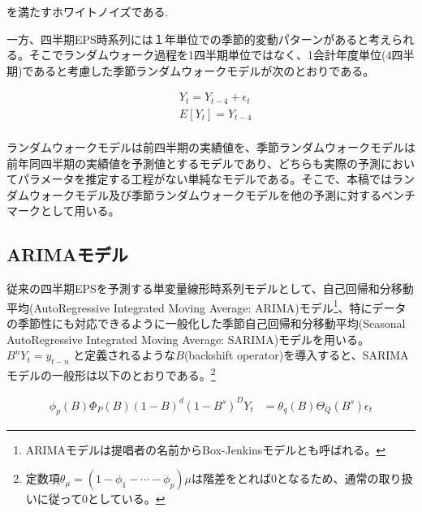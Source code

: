 \documentclass[a4paper, 12pt]{jsreport}
\begin{document}
を満たすホワイトノイズである.

一方、四半期EPS時系列には１年単位での季節的変動パターンがあると考えられる。そこでランダムウォーク過程を1四半期単位ではなく、1会計年度単位(4四半期)であると考慮した季節ランダムウォークモデルが次のとおりである。

\begin{equation}
  \begin{split}
    & Y_t = Y_{t-4} + \epsilon_t \\
    & E[Y_t] = Y_{t-4} \\
  \end{split}
\end{equation} 

ランダムウォークモデルは前四半期の実績値を、季節ランダムウォークモデルは前年同四半期の実績値を予測値とするモデルであり、どちらも実際の予測においてパラメータを推定する工程がない単純なモデルである。そこで、本稿ではランダムウォークモデル及び季節ランダムウォークモデルを他の予測に対するベンチマークとして用いる。

\subsection{ARIMAモデル}

従来の四半期EPSを予測する単変量線形時系列モデルとして、自己回帰和分移動平均(AutoRegressive Integrated Moving Average: ARIMA)モデル\citep{box2015time}\footnote{ARIMAモデルは提唱者の名前からBox-Jenkinsモデルとも呼ばれる。}、特にデータの季節性にも対応できるように一般化した季節自己回帰和分移動平均(Seasonal AutoRegressive Integrated Moving Average: SARIMA)モデルを用いる。$B^nY_t = y_{t-n}$ と定義されるような$B$(backshift operator)を導入すると、SARIMAモデルの一般形は以下のとおりである。\footnote{定数項$\theta_{\mu}=(1-\phi_1-\cdots-\phi_p)\mu$は階差をとれば0となるため、通常の取り扱いに従って0としている。}

\begin{equation}
  \begin{split}
    \phi_p(B)\Phi_{P}(B)(1-B)^d(1-B^s)^DY_t &= \theta_q(B)\Theta_Q(B^s)\epsilon_t
  \end{split}
\end{equation}
\end{document}
